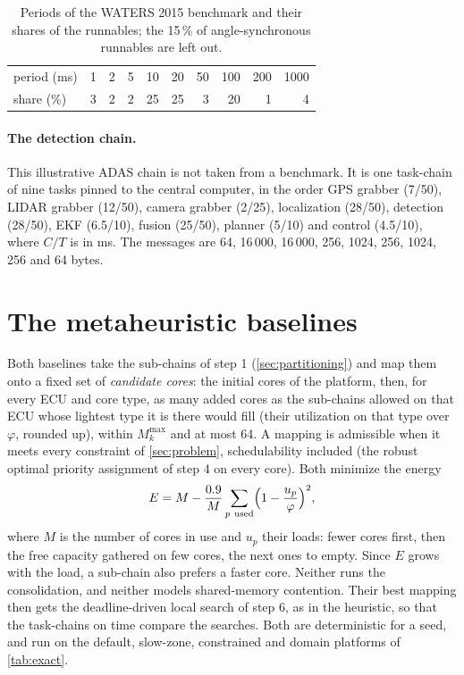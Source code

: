 \begin{table}[ht]
\centering\small
\caption{Periods of the WATERS 2015 benchmark and their shares of the
runnables; the 15\,\% of angle-synchronous runnables are left out.}
\label{tab:periods}
\begin{tabular}{@{}lrrrrrrrrr@{}}
\toprule
period (ms) & 1 & 2 & 5 & 10 & 20 & 50 & 100 & 200 & 1000 \\
share (\%) & 3 & 2 & 2 & 25 & 25 & 3 & 20 & 1 & 4 \\
\bottomrule
\end{tabular}
\end{table}

\paragraph{The detection chain.} This illustrative ADAS chain is not taken
from a benchmark. It is one task-chain of nine tasks pinned to the central
computer, in the order GPS grabber (7/50), LIDAR grabber (12/50),
camera grabber (2/25), localization (28/50), detection (28/50), EKF
(6.5/10), fusion (25/50), planner (5/10) and control (4.5/10), where $C/T$
is in ms. The messages are 64, 16\,000, 16\,000, 256, 1024, 256, 1024, 256
and 64 bytes.

\section{The metaheuristic baselines}
\label{app:baselines}

Both baselines take the sub-chains of step 1 (\cref{sec:partitioning})
and map them onto a fixed set of \emph{candidate cores}: the initial cores
of the platform, then, for every ECU and core type, as many added cores as
the sub-chains allowed on that ECU whose lightest type it is there would
fill (their utilization on that type over $\varphi$, rounded up), within $M^{\max}_k$ and at most 64. A
mapping is admissible when it meets every constraint of
\cref{sec:problem}, schedulability included (the robust optimal priority
assignment of step 4 on every core). Both minimize the energy
\begin{equation}
E=M-\frac{0.9}{M}\sum_{p\ \text{used}}\Bigl(1-\frac{u_p}{\varphi}\Bigr)^2,
\label{eq:energy}
\end{equation}
where $M$ is the number of cores in use and $u_p$ their loads: fewer cores
first, then the free capacity gathered on few cores, the next ones to
empty. Since $E$ grows with the load, a sub-chain also prefers a
faster core. Neither runs the consolidation, and neither models
shared-memory contention. Their best mapping then gets the
deadline-driven local search of step 6, as in the heuristic, so that the
task-chains on time compare the searches. Both are deterministic for a
seed, and run on the default, slow-zone, constrained and domain
platforms of \cref{tab:exact}.

